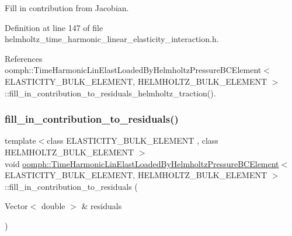 Fill in contribution from Jacobian. 



Definition at line 147 of file helmholtz\+\_\+time\+\_\+harmonic\+\_\+linear\+\_\+elasticity\+\_\+interaction.\+h.



References oomph\+::\+Time\+Harmonic\+Lin\+Elast\+Loaded\+By\+Helmholtz\+Pressure\+B\+C\+Element$<$ E\+L\+A\+S\+T\+I\+C\+I\+T\+Y\+\_\+\+B\+U\+L\+K\+\_\+\+E\+L\+E\+M\+E\+N\+T, H\+E\+L\+M\+H\+O\+L\+T\+Z\+\_\+\+B\+U\+L\+K\+\_\+\+E\+L\+E\+M\+E\+N\+T $>$\+::fill\+\_\+in\+\_\+contribution\+\_\+to\+\_\+residuals\+\_\+helmholtz\+\_\+traction().

\mbox{\label{classoomph_1_1TimeHarmonicLinElastLoadedByHelmholtzPressureBCElement_a0a69b95db2d95da34929a9750d3bce3d}} 
\subsubsection{\texorpdfstring{fill\+\_\+in\+\_\+contribution\+\_\+to\+\_\+residuals()}{fill\_in\_contribution\_to\_residuals()}}
{\footnotesize\ttfamily template$<$class E\+L\+A\+S\+T\+I\+C\+I\+T\+Y\+\_\+\+B\+U\+L\+K\+\_\+\+E\+L\+E\+M\+E\+NT , class H\+E\+L\+M\+H\+O\+L\+T\+Z\+\_\+\+B\+U\+L\+K\+\_\+\+E\+L\+E\+M\+E\+NT $>$ \\
void \hyperlink{classoomph_1_1TimeHarmonicLinElastLoadedByHelmholtzPressureBCElement}{oomph\+::\+Time\+Harmonic\+Lin\+Elast\+Loaded\+By\+Helmholtz\+Pressure\+B\+C\+Element}$<$ E\+L\+A\+S\+T\+I\+C\+I\+T\+Y\+\_\+\+B\+U\+L\+K\+\_\+\+E\+L\+E\+M\+E\+NT, H\+E\+L\+M\+H\+O\+L\+T\+Z\+\_\+\+B\+U\+L\+K\+\_\+\+E\+L\+E\+M\+E\+NT $>$\+::fill\+\_\+in\+\_\+contribution\+\_\+to\+\_\+residuals (\begin{DoxyParamCaption}\item[{Vector$<$ double $>$ \&}]{residuals }\end{DoxyParamCaption})\hspace{0.3cm}{\ttfamily [inline]}}



